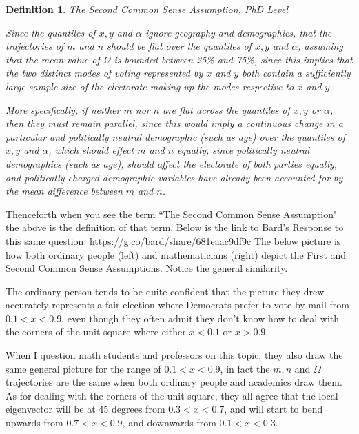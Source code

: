 \documentclass[preprint,13pt]{elsarticle}
\newtheorem{definition}{Definition}[section]
\begin{document}
\begin{definition}{The Second Common Sense Assumption, PhD Level}

Since the quantiles of $x,y$ and $\alpha$ ignore geography and demographics, that the trajectories of $m$ and $n$ should be flat over the quantiles of $x,y$ and $\alpha$, assuming that the mean value of $\Omega$ is bounded between 25\% and 75\%, since this implies that the two distinct modes of voting represented by $x$ and $y$ both contain a sufficiently large sample size of the electorate making up the modes respective to $x$ and $y$. 

More specifically, if neither $m$ nor $n$ are flat across the quantiles of $x,y$ or $\alpha$, then they must remain parallel, since this would imply a continuous change in a particular and politically neutral demographic (such as age) over the quantiles of $x,y$ and $\alpha$, which should effect $m$ and $n$ equally, since politically neutral demographics (such as age), should affect the electorate of both parties equally, and politically charged demographic variables have already been accounted for by the mean difference between $m$ and $n$.
\end{definition}
Thenceforth when you see the term ``The Second Common Sense Assumption" the above is the definition of that term. Below is the link to Bard's Response to this same question: \url{https://g.co/bard/share/681eaac9df9c}
\newpage
The below picture is how both ordinary people (left) and mathematicians (right) depict the First and Second Common Sense Assumptions. Notice the general similarity.

The ordinary person tends to be quite confident that the picture they drew accurately represents a fair election where Democrats prefer to vote by mail from $0.1<x<0.9$, even though they often admit they don't know how to deal with the corners of the unit square where either $x<0.1$ or $x>0.9$.

When I question math students and professors on this topic, they also draw the same general picture for the range of $0.1<x<0.9$, in fact the $m,n$ and $\Omega$ trajectories are the same when both ordinary people and academics draw them. As for dealing with the corners of the unit square,  they all agree that the local eigenvector will be at 45 degrees from $0.3<x<0.7$, and will start to bend upwards from $0.7<x<0.9$, and downwards from $0.1<x<0.3$. 
\end{document}
